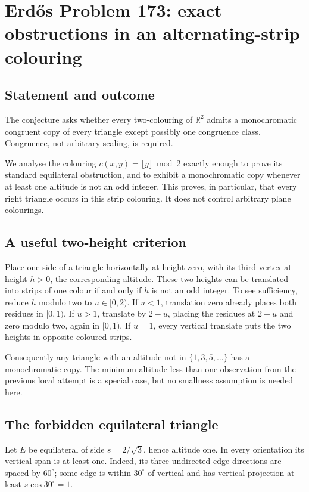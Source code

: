 \section*{Erd\H{o}s Problem 173: exact obstructions in an alternating-strip colouring}
\subsection*{Statement and outcome}
The conjecture asks whether every two-colouring of $\mathbb R^2$ admits a monochromatic congruent copy of every triangle except possibly one congruence class. Congruence, not arbitrary scaling, is required.

We analyse the colouring $c(x,y)=\lfloor y\rfloor\bmod2$ exactly enough to prove its standard equilateral obstruction, and to exhibit a monochromatic copy whenever at least one altitude is not an odd integer. This proves, in particular, that every right triangle occurs in this strip colouring. It does not control arbitrary plane colourings.

\subsection*{A useful two-height criterion}
Place one side of a triangle horizontally at height zero, with its third vertex at height $h>0$, the corresponding altitude. These two heights can be translated into strips of one colour if and only if $h$ is not an odd integer.
To see sufficiency, reduce $h$ modulo two to $u\in[0,2)$. If $u<1$, translation zero already places both residues in $[0,1)$. If $u>1$, translate by $2-u$, placing the residues at $2-u$ and zero modulo two, again in $[0,1)$. If $u=1$, every vertical translate puts the two heights in opposite-coloured strips.

Consequently any triangle with an altitude not in $\{1,3,5,\ldots\}$ has a monochromatic copy. The minimum-altitude-less-than-one observation from the previous local attempt is a special case, but no smallness assumption is needed here.

\subsection*{The forbidden equilateral triangle}
Let $E$ be equilateral of side $s=2/\sqrt3$, hence altitude one.
In every orientation its vertical span is at least one. Indeed, its three undirected edge directions are spaced by $60^\circ$; some edge is within $30^\circ$ of vertical and has vertical projection at least $s\cos30^\circ=1$.

